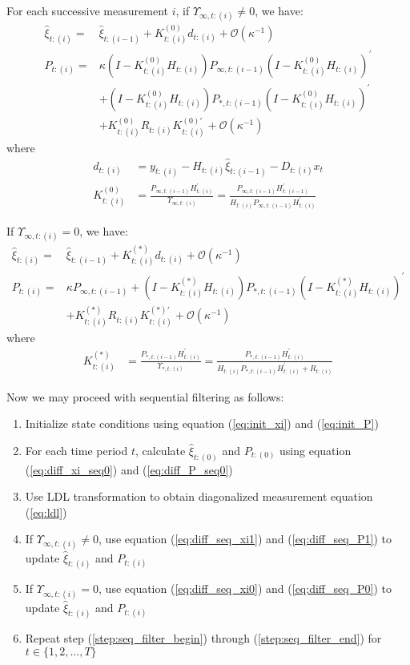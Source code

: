 \documentclass[12pt]{article}
\newenvironment{boenumerate}
    {\begin{enumerate}\renewcommand\labelenumi{\textbf\theenumi}}
    {\end{enumerate}}
\numberwithin{equation}{section}
\begin{document}
For each successive measurement $i$, if $\Upsilon_{\infty,t:(i)}\neq0$, we have:
\begin{align}
    \hat{\xi}_{t:(i)} = & \hat{\xi}_{t:(i-1)} + K_{t:(i)}^{(0)}d_{t:(i)} + \mathcal{O}(\kappa^{-1}) \label{eq:diff_seq_xi1} \\
    P_{t:(i)} =& \kappa(I-K_{t:(i)}^{(0)}H_{t:(i)})P_{\infty,t:(i-1)}(I-K_{t:(i)}^{(0)}H_{t:(i)})^{'} \label{eq:diff_seq_P1} \\
        & + (I-K_{t:(i)}^{(0)}H_{t:(i)})P_{*,t:(i-1)}(I-K_{t:(i)}^{(0)}H_{t:(i)})^{'} \nonumber \\
        & + K_{t:(i)}^{(0)}R_{t:(i)}K_{t:(i)}^{(0)'} + \mathcal{O}(\kappa^{-1}) \nonumber
\end{align}
where
\begin{align*}
    d_{t:(i)} &= y_{t:(i)} - H_{t:(i)}\hat{\xi}_{t:(i-1)}-D_{t:(i)}x_t \\
    K_{t:(i)}^{(0)} &= \frac{P_{\infty,t:(i-1)}H_{t:(i)}^{'}}{\Upsilon_{\infty,t:(i)}} 
        =\frac{P_{\infty,t:(i-1)}H_{t:(i-1)}^{'}}{H_{t:(i)}P_{\infty, t:(i-1)}H_{t:(i)}^{'}}
\end{align*}

If $\Upsilon_{\infty,t:(i)}=0$, we have:
\begin{align}
    \hat{\xi}_{t:(i)} =& \hat{\xi}_{t:(i-1)} + K_{t:(i)}^{(*)}d_{t:(i)} + \mathcal{O}(\kappa^{-1}) \label{eq:diff_seq_xi0} \\
    P_{t:(i)} =& \kappa P_{\infty,t:(i-1)} + (I-K_{t:(i)}^{(*)}H_{t:(i)})P_{*,t:(i-1)}(I-K_{t:(i)}^{(*)}H_{t:(i)})^{'} \label{eq:diff_seq_P0} \\
        &+ K_{t:(i)}^{(*)}R_{t:(i)}K_{t:(i)}^{(*)'} + \mathcal{O}(\kappa^{-1}) \nonumber 
\end{align}
where
\begin{align*}
    K_{t:(i)}^{(*)} &= \frac{P_{*,t:(i-1)}H_{t:(i)}^{'}}{\Upsilon_{*,t:(i)}} = \frac{P_{*,t:(i-1)}H_{t:(i)}^{'}}{H_{t:(i)}P_{*,t:(i-1)}H_{t:(i)}^{'} + R_{t:(i)}}
\end{align*}

Now we may proceed with sequential filtering as follows:
\begin{boenumerate}
    \item Initialize state conditions using equation (\ref{eq:init_xi}) and (\ref{eq:init_P}) 
    \item For each time period $t$, calculate $\hat{\xi}_{t:(0)}$ and $P_{t:{(0)}}$ using equation (\ref{eq:diff_xi_seq0}) and (\ref{eq:diff_P_seq0}) \label{step:seq_filter_begin}
    \item Use LDL transformation to obtain diagonalized measurement equation (\ref{eq:ldl})
    \item If $\Upsilon_{\infty,t:(i)}\neq0$, use equation (\ref{eq:diff_seq_xi1}) and (\ref{eq:diff_seq_P1}) to update $\hat{\xi}_{t:(i)}$ and $P_{t:(i)}$
    \item If $\Upsilon_{\infty,t:(i)}=0$, use equation (\ref{eq:diff_seq_xi0}) and (\ref{eq:diff_seq_P0}) to update $\hat{\xi}_{t:(i)}$ and $P_{t:(i)}$ \label{step:seq_filter_end}
    \item Repeat step (\ref{step:seq_filter_begin}) through (\ref{step:seq_filter_end}) for $t\in\{1,2,...,T\}$
\end{boenumerate}
\end{document}
